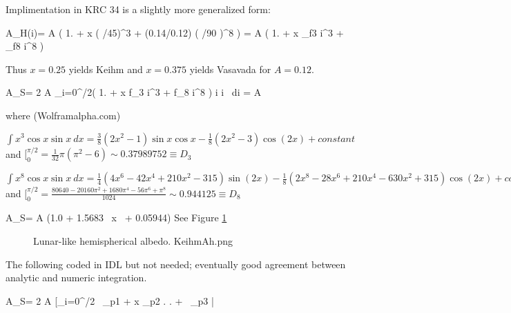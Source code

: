 Implimentation in KRC 34 is a slightly more generalized form:

 \qbn A_H(i)= A \left( 1. + x \left( \theta /45\right)^3 + (0.14/0.12) \left( \theta /90 \right)^8 \right) = A \left( 1. + x _{f3} i^3
+  _{f8}  i^8 \right)   \qen

Thus $x=0.25$ yields Keihm and  $x=0.375$ yields Vasavada for $A=0.12$.

\qb A_S=  2 A  \int_{i=0}^{\pi/2}\left( 1. + x f_3 i^3 + f_8 i^8 \right) \cos i \sin i \ di 
 = A \left[ 1. + 2f_3 D_3 \ x \ + 2f_8 D_8 \right] \qe 

where  (Wolframalpha.com)

$\int x^3 \cos x \sin x \  dx = \frac{3}{8} (2 x^2-1) \sin x \cos x -\frac{1}{8}(2 x^2-3) \cos(2 x)+constant$ and 
$ [_0^{\pi/2} = \frac{1}{32} \pi ( \pi^2-6) \sim 0.37989752  \equiv  D_3 $

$ \int x^8 \cos x \sin x \ dx = \frac{1}{4}(4 x^6 -42 x^4 +210 x^2 -315) \sin(2 x)-\frac{1}{8} (2 x^8 -28 x^6 +210 x^4 -630 x^2 +315) \cos (2 x)+constant$ 
and $ [_0^{\pi/2} = \frac{80640-20160 \pi^2+1680 \pi^4-56 \pi^6+\pi^8}{1024} \sim 0.944125 \equiv  D_8 $

\qbn A_S=  A \left(1.0 + 1.5683 \ x \ + 0.05944\right) 
 See Figure \ref{KeihmAh} 
 
\begin{figure}[!ht] 
\caption[Lunar-like albedo]{Lunar-like hemispherical albedo.
\label{KeihmAh} KeihmAh.png }
\end{figure} 

\footnotesize

The following coded in IDL but not needed; eventually good agreement between
analytic and numeric integration.

\qbn A_S=  2 A \left[_{i=0}^{\pi/2} \ _{p1} 
+  x _{p2}  \right. 
\qb  \left. + \ _{p3} \right| \qe 

